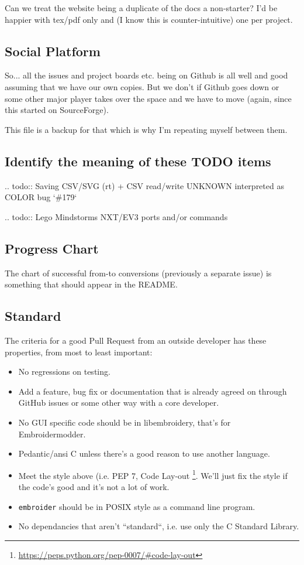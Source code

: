 \documentclass[a4paper]{report}
\begin{document}
Can we treat the website being a duplicate of the docs a non-starter?
I'd be happier with tex/pdf only and (I know this is counter-intuitive)
one per project.

\subsection{Social Platform}

So... all the issues and project boards etc. being on Github is all
well and good assuming that we have our own copies. But we don't if
Github goes down or some other major player takes over the space and we
have to move (again, since this started on SourceForge).

This file is a backup for that which is why I'm repeating myself between
them.

\subsection{Identify the meaning of these TODO items}

.. todo::
   Saving CSV/SVG (rt) + CSV read/write UNKNOWN interpreted as COLOR bug `\#179`

.. todo::
   Lego Mindstorms NXT/EV3 ports and/or commands

\subsection{Progress Chart}

The chart of successful from-to conversions (previously a separate issue)
is something that should appear in the README.

\subsection{Standard}

The criteria for a good Pull Request from an outside developer has these properties, from most to least important:

\begin{itemize}
\item No regressions on testing.
\item Add a feature, bug fix or documentation that is already agreed on through
    GitHub issues or some other way with a core developer.
\item No GUI specific code should be in libembroidery, that's for Embroidermodder.
\item Pedantic/ansi C unless there's a good reason to use another language.
\item Meet the style above (i.e.  PEP 7, Code Lay-out
    \footnote{\url{https://peps.python.org/pep-0007/#code-lay-out}}.
    We'll just fix the style if the code's good and it's not a lot of work.
\item \texttt{embroider} should be in POSIX style as a command line program.
\item No dependancies that aren't ``standard``, i.e. use only the C Standard Library.
\end{itemize}
\fi
\end{document}

